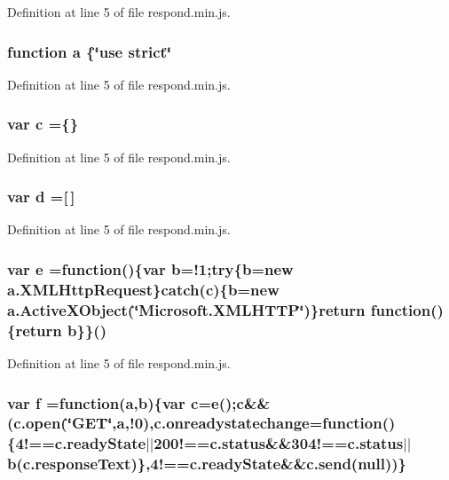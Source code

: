Definition at line 5 of file respond.\+min.\+js.

\subsubsection[{a}]{\setlength{\rightskip}{0pt plus 5cm}function {\bf a} \{\char`\"{}use strict\char`\"{}}\label{respond_8min_8js_aa4d4888597588a84fd5b1184d00c91f3}


Definition at line 5 of file respond.\+min.\+js.

\subsubsection[{c}]{\setlength{\rightskip}{0pt plus 5cm}var {\bf c} =\{\}}\label{respond_8min_8js_abce695e0af988ece0826d9ad59b8160d}


Definition at line 5 of file respond.\+min.\+js.

\subsubsection[{d}]{\setlength{\rightskip}{0pt plus 5cm}var d =[$\,$]}\label{respond_8min_8js_aeb337d295abaddb5ec3cb34cc2e2bbc9}


Definition at line 5 of file respond.\+min.\+js.

\subsubsection[{e}]{\setlength{\rightskip}{0pt plus 5cm}var e =function()\{var {\bf b}=!1;{\bf try}\{{\bf b}=new a.\+X\+M\+L\+Http\+Request\}catch({\bf c})\{{\bf b}=new a.\+Active\+X\+Object(\char`\"{}Microsoft.\+X\+M\+L\+H\+T\+T\+P\char`\"{})\}return function()\{{\bf return} {\bf b}\}\}()}\label{respond_8min_8js_ab5902775854a8b8440bcd25e0fe1c120}


Definition at line 5 of file respond.\+min.\+js.

\subsubsection[{f}]{\setlength{\rightskip}{0pt plus 5cm}var f =function({\bf a},{\bf b})\{var {\bf c}={\bf e}();{\bf c}\&\&(c.\+open(\char`\"{}G\+E\+T\char`\"{},a,!0),c.\+onreadystatechange=function()\{4!==c.\+ready\+State$\vert$$\vert$200!==c.\+status\&\&304!==c.\+status$\vert$$\vert${\bf b}(c.\+response\+Text)\},4!==c.\+ready\+State\&\&c.\+send(null))\}}\label{respond_8min_8js_a9cf09a2972472098a4c689fd988f4dfc}


